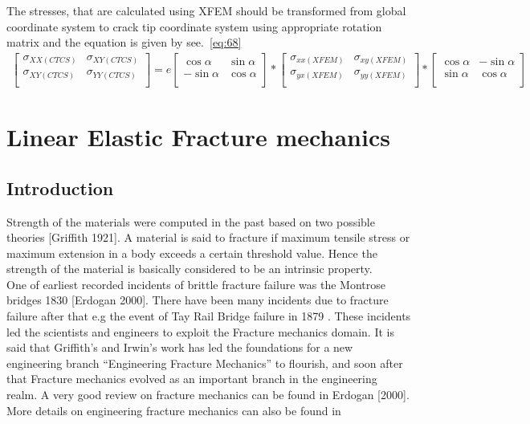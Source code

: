 \documentclass[fleqn, 12.5pt,a4paper]{report}
\begin{document}
The stresses, that are calculated using XFEM should be transformed from global coordinate system to crack tip coordinate system using appropriate rotation matrix \cite{ahmed2009extended} and the equation is given by see.~\autoref{eq:68} 
\begin{align}\label{eq:68}
\hspace{0cm}\begin{bmatrix}
\sigma_{XX (CTCS)} & \sigma_{XY (CTCS)}\\
\sigma_{XY (CTCS)} & \sigma_{YY (CTCS)}\\
\end{bmatrix}
=e
\begin{bmatrix}
\cos\alpha & \sin\alpha\\
-\sin\alpha & \cos\alpha\\
\end{bmatrix}
*
\begin{bmatrix}
\sigma_{xx (XFEM)} & \sigma_{xy (XFEM)}\\
\sigma_{yx (XFEM)} & \sigma_{yy (XFEM)}\\
\end{bmatrix}
*
\begin{bmatrix}
\cos\alpha & -\sin\alpha\\
\sin\alpha & \cos\alpha\\
\end{bmatrix}
\end{align}
\section{\large{Linear Elastic Fracture mechanics}}
\subsection{Introduction}

Strength of the materials were computed in the past based on two possible theories [Griffith 1921]. A material is said to fracture if maximum tensile stress or maximum extension in a body exceeds a certain threshold value\cite{kuna2013finite}. Hence the strength of the material is basically considered to be an intrinsic property. \\
One of earliest recorded incidents of brittle fracture failure was the Montrose bridges 1830 [Erdogan 2000]. There have been many incidents due to fracture failure after that e.g the event of Tay Rail Bridge failure in 1879 \cite{kuna2013finite}. These incidents led the scientists and engineers to exploit the Fracture mechanics domain. 
It is said that Griffith’s and Irwin’s work has led the foundations for a new engineering branch “Engineering Fracture Mechanics” to flourish, and soon after that Fracture mechanics evolved as an important branch in the engineering realm. 
A very good review on fracture mechanics can be found in Erdogan [2000]. More details on engineering fracture mechanics can also be found in \cite{kuna2013finite}
\end{document}
